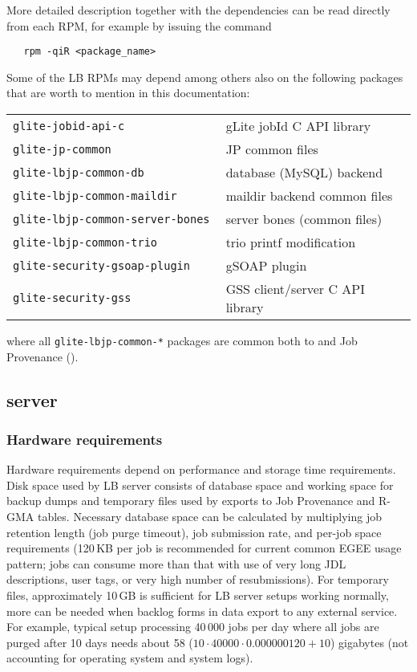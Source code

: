 More detailed description together with the dependencies can be read directly from each RPM,
for example by issuing the command 
\begin{verbatim}
   rpm -qiR <package_name>
\end{verbatim}

Some of the LB RPMs may depend among others also on the following packages
that are worth to mention in this documentation:

\begin{tabularx}{\textwidth}{>{\tt}lX}
glite-jobid-api-c & gLite jobId C API library \\ 
glite-jp-common & JP common files \\ 
glite-lbjp-common-db & database (MySQL) backend \\
glite-lbjp-common-maildir & maildir backend common files \\
glite-lbjp-common-server-bones & server bones (common files) \\
glite-lbjp-common-trio & trio printf modification \\
glite-security-gsoap-plugin & gSOAP plugin \\ 
glite-security-gss & GSS client/server C API library \\
\end{tabularx}

where all \verb'glite-lbjp-common-*' packages are common both to \LB and 
Job Provenance (\JP).


\subsection{\LB server}

\subsubsection{Hardware requirements}
\label{inst:hw_req}

Hardware requirements depend on performance and storage time requirements.
Disk space used by LB server consists of database space and working space 
for backup dumps and temporary files used by exports to Job Provenance and
R-GMA tables. Necessary database space can be calculated by multiplying 
job retention length (job purge timeout), job submission rate, and  
per-job space requirements (120\,KB per job is recommended for current common 
EGEE usage pattern; jobs can consume more than that with use of very long
JDL descriptions, user tags, or very high number of resubmissions).
For temporary files, approximately 10\,GB is sufficient for LB server setups
working normally, more can be needed when backlog forms in data export
to any external service. For example, typical setup processing 40\,000 jobs per 
day where all jobs are purged after 10 days needs about 58
($10 \cdot 40000 \cdot 0.000000120 + 10$) gigabytes (not accounting for operating 
system and system logs).

